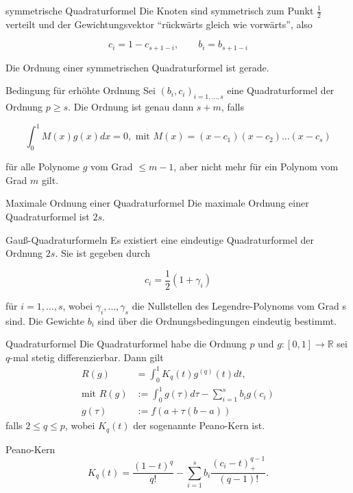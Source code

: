 \begin{flashcard}[Definition]{symmetrische Quadraturformel}
	Die Knoten sind symmetrisch zum Punkt $\frac{1}{2}$ verteilt und der Gewichtungsvektor "`rückwärts gleich wie vorwärts"', also

$$ c_i = 1 - c_{s+1-i},\qquad b_i = b_{s + 1 - i}$$

Die Ordnung einer symmetrischen Quadraturformel ist gerade.
\end{flashcard}

\begin{flashcard}[Satz]{Bedingung für erhöhte Ordnung}
	Sei $(b_i, c_i)_{i=1,\ldots,s}$ eine Quadraturformel der Ordnung $p \geq s$. Die Ordnung ist genau dann $s + m$, falls

	$$ \int_0^1 M(x) g(x) dx = 0, \text{ mit } M(x) = (x-c_1)(x-c_2) \dots (x-c_s)$$

	für alle Polynome $g$ vom Grad $\leq m - 1$, aber nicht mehr für ein Polynom vom Grad $m$ gilt.
\end{flashcard}

\begin{flashcard}[Satz]{Maximale Ordnung einer Quadraturformel}
	Die maximale Ordnung einer Quadraturformel ist $2s$.
\end{flashcard}

\begin{flashcard}[Satz]{Gauß-Quadraturformeln}
	Es existiert eine eindeutige Quadraturformel der Ordnung $2s$. Sie ist gegeben durch

	$$ c_i = \frac{1}{2}(1 + \gamma_i) $$

	für $i = 1,\ldots,s$, wobei $\gamma_i,\ldots,\gamma_s$ die Nullstellen des Legendre-Polynoms vom Grad s sind.
	Die Gewichte $b_i$ sind über die Ordnungsbedingungen eindeutig bestimmt.
\end{flashcard}

\begin{flashcard}[Satz]{Quadraturformel}
	Die Quadraturformel habe die Ordnung $p$ und $g : [0, 1] \rightarrow \mathbb{R}$ sei $q$-mal stetig differenzierbar.
	Dann gilt
	{\begin{align*}
		R(g) &= \int_0^1 K_q(t) g^{(q)}(t) dt,\\
		\text{mit } R(g) &:= \int_0^1 g(\tau) d\tau - \sum_{i=1}^s b_i g(c_i)\\
		g(\tau) &:= f(a + \tau(b-a))
	\end{align*}}
	falls $2 \leq q \leq p$, wobei $K_q(t)$ der sogenannte Peano-Kern ist.
\end{flashcard}

\begin{flashcard}[Definition]{Peano-Kern}
$$ K_q(t) = \frac{(1-t)^q}{q!} - \sum_{i=1}^s b_i \frac{(c_i - t)_{+}^{q-1}}{(q-1)!}.$$
\end{flashcard}
